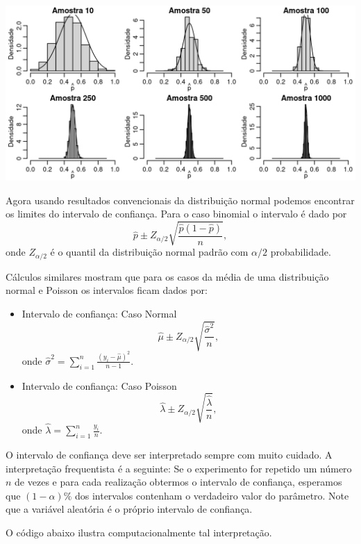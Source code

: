 \documentclass[
  10pt,
  a4paper]{book}
\begin{document}
\begin{center}\includegraphics[width=0.99\linewidth]{figures/unnamed-chunk-385-1} \end{center}

Agora usando resultados convencionais da distribuição normal podemos encontrar os limites do intervalo de confiança. Para o caso binomial o intervalo é dado por
\[\hat{p} \pm Z_{\alpha/2} \sqrt{\frac{\hat{p}(1-\hat{p})}{n}},\]
onde \(Z_{\alpha/2}\) é o quantil da distribuição normal padrão com \(\alpha/2\) probabilidade.

Cálculos similares mostram que para os casos da média de uma distribuição normal e Poisson os intervalos ficam dados por:

\begin{itemize}
\item
  Intervalo de confiança: Caso Normal
  \[\hat{\mu} \pm Z_{\alpha/2} \sqrt{\frac{\hat{\sigma}^2}{n}},\]
  onde \(\hat{\sigma}^2 = \sum_{i=1}^n \frac{(y_i - \hat{\mu})^2}{n-1}\).
\item
  Intervalo de confiança: Caso Poisson
  \[\hat{\lambda} \pm Z_{\alpha/2} \sqrt{\frac{\hat{\lambda}}{n}},\]
  onde \(\hat{\lambda} = \sum_{i=1}^n \frac{y_i}{n}.\)
\end{itemize}

O intervalo de confiança deve ser interpretado sempre com muito cuidado. A interpretação frequentista é a seguinte: Se o experimento for repetido um número \(n\) de vezes e para cada realização obtermos o intervalo de confiança, esperamos que \((1-\alpha)\%\) dos intervalos contenham o verdadeiro valor do parâmetro. Note que a variável aleatória é o próprio intervalo de confiança.

O código abaixo ilustra computacionalmente tal interpretação.
\end{document}
